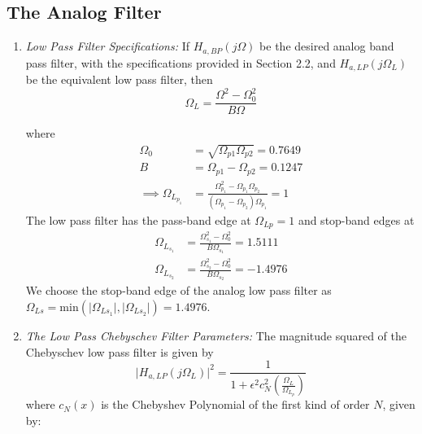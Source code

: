 \documentclass{article}
\begin{document}
\subsection{The Analog Filter}
\begin{enumerate}

\item {\em Low Pass Filter Specifications:}  If $H_{a, BP}(j\Omega)$ be the desired analog band
pass filter,  with the specifications provided in Section 2.2, and $H_{a,LP}(j\Omega_L)$ 
be the equivalent low pass filter, then
\begin{equation}
\label{transition}
\Omega_L = \frac{\Omega^2 - \Omega_0^2}{B\Omega}
\end{equation}

where 
\begin{align*}
\Omega_0 &= \sqrt{\Omega_{p1}\Omega_{p2}} = 0.7649\\
B &= \Omega_{p1} - \Omega_{p2} = 0.1247\\
	\implies \Omega_{L_{p_1}} &= \frac{\Omega_{p_1}^2 - \Omega_{p_1}\Omega_{p_2}}{(\Omega_{p_1} - \Omega_{p_2})\Omega_{p_1}} = 1
\end{align*}
The low pass filter has
the pass-band edge at $\Omega_{Lp} = 1$ and stop-band edges at 
\begin{align*}
    \Omega_{L_{s_1}} &= \frac{\Omega_{s_1}^2 - \Omega_0^2}{B\Omega_{s_1}} =  1.5111\\
    \Omega_{L_{s_2}} &= \frac{\Omega_{s_2}^2 - \Omega_0^2}{B\Omega_{s_2}} = -1.4976
\end{align*}
We choose the stop-band edge of the analog low pass filter as $\Omega_{Ls} = \mbox{min}(\vert \Omega_{Ls_1}\vert,\vert \Omega_{Ls_2}\vert) = 1.4976$.

\item {\em The Low Pass Chebyschev Filter Parameters:}  The magnitude squared of the Chebyschev low pass filter is given by 
\begin{equation}
\label{lpfirst}
\vert H_{a,LP}(j\Omega_L)\vert^2 = \frac{1}{1 + \epsilon^2c_N^2\left(\frac{\Omega_L}{\Omega_{L_p}}\right)}
\end{equation}
where $c_N(x)$ is the Chebyshev Polynomial of the first kind of order $N$, given by:


\end{enumerate}
\end{document}

